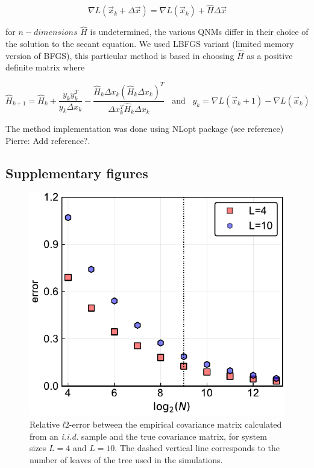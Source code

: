 \documentclass[preprint,amsmath,amssymb,superscriptaddress,showpacs,pre]{revtex4-1}
\newcommand{\pierre}[1]{{\color{red}Pierre: #1}}
\begin{document}
$$\nabla L(\vec{x}_k+\Delta\vec{x})=\nabla L(\vec{x}_k)+\hat{H} \Delta\vec{x} $$


for $n-dimensions$ $\hat{H}$ is undetermined, the various QNMs differ in their choice of the solution to the secant equation. We used LBFGS variant  (limited memory version of BFGS), this particular method is based in choosing $\hat{H}$ as a positive definite matrix where

$$\hat{H}_{k+1}=\hat{H}_{k}+\frac{y_k y^{T}_k}{y_k\Delta x_k} - \frac{\hat{H}_k\Delta x_k(\hat{H}_k\Delta x_k)^T}{\Delta x^T_k\hat{H}_k\Delta x_k} \;\;\;\text{and}\;\;\; y_k=\nabla L(\vec{x}_k+1)-\nabla L(\vec{x}_k)$$

The method implementation was done using   NLopt package (see reference) \pierre{Add reference?}.
 
\subsection{Supplementary figures}
\label{sub:supplementary_figures}

\begin{figure}[!htb]
	\centering
	\includegraphics[keepaspectratio=true,width=1.0\textwidth]{Figures/error_Ciid_vs_numb_of_seq.pdf}
	\caption{Relative $l2$-error between the empirical covariance matrix calculated from an \emph{i.i.d.} sample and the true covariance matrix, for system sizes $L=4$ and $L=10$. The dashed vertical line corresponds to the number of leaves of the tree used in the simulations.}
	\label{fig:error_vs_nseqs}
\end{figure}
\end{document}
